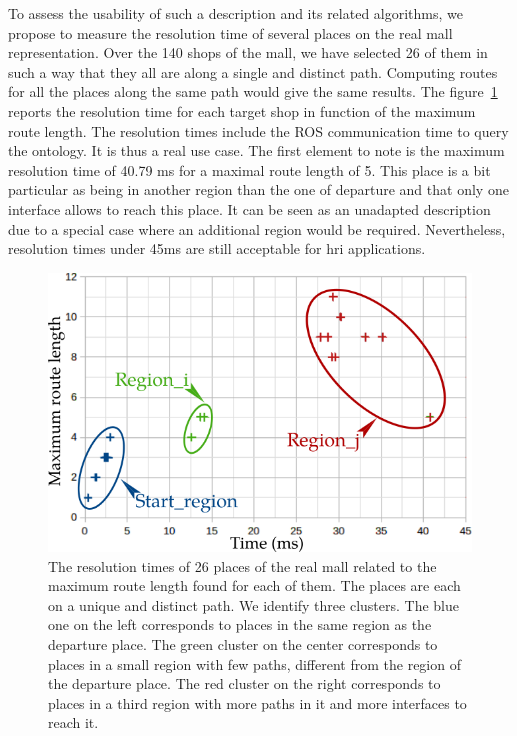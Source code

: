 To assess the usability of such a description and its related algorithms, we propose to measure the resolution time of several places on the real mall representation. Over the 140 shops of the mall, we have selected 26 of them in such a way that they all are along a single and distinct path. Computing routes for all the places along the same path would give the same results. The figure~\ref{fig:chap3_performance} reports the resolution time for each target shop in function of the maximum route length. The resolution times include the ROS communication time to query the ontology. It is thus a real use case. The first element to note is the maximum resolution time of 40.79 ms for a maximal route length of 5. This place is a bit particular as being in another region than the one of departure and that only one interface allows to reach this place. It can be seen as an unadapted description due to a special case where an additional region would be required. Nevertheless, resolution times under 45ms are still acceptable for \acrshort{hri} applications.

\begin{figure}[ht!]
\centering
\includegraphics[scale=0.6]{figures/chapter3/performance.png}
\caption{\label{fig:chap3_performance} The resolution times of 26 places of the real mall related to the maximum route length found for each of them. The places are each on a unique and distinct path. We identify three clusters. The blue one on the left corresponds to places in the same region as the departure place. The green cluster on the center corresponds to places in a small region with few paths, different from the region of the departure place. The red cluster on the right corresponds to places in a third region with more paths in it and more interfaces to reach it. }
\end{figure}

